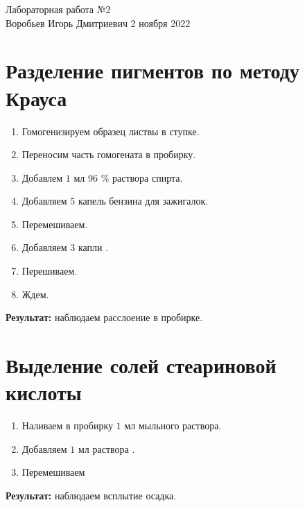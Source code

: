 \documentclass[12pt, letterpaper, twoside]{article}
\begin{document}
\begin{center}
	\LARGE{Лабораторная работа №2}\\[0.2cm]
	\large{Воробьев Игорь Дмитриевич}
	\large{2 ноября 2022}
\end{center}

\section{Разделение пигментов по методу Крауса}
\begin{enumerate}
	\item Гомогенизируем образец листвы в ступке.
	\item Переносим часть гомогената в пробирку.
	\item Добавлем $1$ мл 96 \% раствора спирта.
	\item Добавляем $5$ капель бензина для зажигалок.
	\item Перемешиваем.
	\item Добавляем $3$ капли .
	\item Перешиваем.
	\item Ждем.
\end{enumerate}
\textbf{Результат:} наблюдаем расслоение в пробирке.

\section{Выделение солей стеариновой кислоты}
\begin{enumerate}
	\item Наливаем в пробирку $1$ мл мыльного раствора.
	\item Добавляем $1$ мл раствора .
	\item Перемешиваем
\end{enumerate}
\textbf{Результат:} наблюдаем всплытие осадка.
\end{document}
